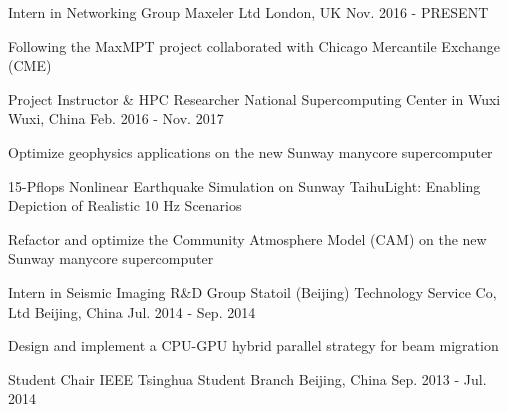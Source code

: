 \documentclass[11pt, a4paper]{awesome-cv}
\begin{document}
\begin{cventries}

  \cventry
    {Intern in Networking Group} %
    {Maxeler Ltd} %
    {London, UK} %
    {Nov. 2016 - PRESENT} %
    {
      \begin{cvitems} %
        \item {Following the MaxMPT project collaborated with Chicago Mercantile Exchange (CME)}
      \end{cvitems}
    }
    
  \cventry
    {Project Instructor \& HPC Researcher} %
    {National Supercomputing Center in Wuxi} %
    {Wuxi, China} %
    {Feb. 2016 - Nov. 2017} %
    {
      \begin{cvitems} %
        \item {Optimize geophysics applications on the new Sunway manycore supercomputer}
        \item {15-Pflops Nonlinear Earthquake Simulation on Sunway TaihuLight: Enabling Depiction of Realistic 10 Hz Scenarios}
        \item {Refactor and optimize the Community Atmosphere Model (CAM) on the new Sunway manycore supercomputer}
      \end{cvitems}
    }

  \cventry
    {Intern in Seismic Imaging R\&D Group} %
    {Statoil (Beijing) Technology Service Co, Ltd} %
    {Beijing, China} %
    {Jul. 2014 - Sep. 2014} %
    {
      \begin{cvitems} %
        \item {Design and implement a CPU-GPU hybrid parallel strategy for beam migration}
      \end{cvitems}
    }

  \cventry
    {Student Chair} %
    {IEEE Tsinghua Student Branch} %
    {Beijing, China} %
    {Sep. 2013 - Jul. 2014} %
    {
    }

\end{cventries}
\end{document}
